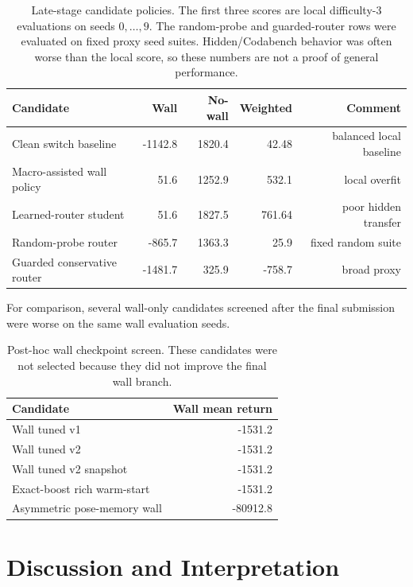 \documentclass[11pt, oneside]{article}   	%
\begin{document}
\begin{table}[htbp]
\centering
\small
\begin{tabular}{p{}rrrr}
\toprule
Candidate & Wall & No-wall & Weighted & Comment \\
\midrule
Clean switch baseline & -1142.8 & 1820.4 & 42.48 & balanced local baseline \\
Macro-assisted wall policy & 51.6 & 1252.9 & 532.1 & local overfit \\
Learned-router student & 51.6 & 1827.5 & 761.64 & poor hidden transfer \\
Random-probe router & -865.7 & 1363.3 & 25.9 & fixed random suite \\
Guarded conservative router & -1481.7 & 325.9 & -758.7 & broad proxy \\
\bottomrule
\end{tabular}
\caption{Late-stage candidate policies. The first three scores are local difficulty-3
evaluations on seeds \(0,\ldots,9\). The random-probe and guarded-router rows were
evaluated on fixed proxy seed suites. Hidden/Codabench behavior was often worse than
the local score, so these numbers are not a proof of general performance.}
\label{tab:late_candidates}
\end{table}

For comparison, several wall-only candidates screened after the final submission were
worse on the same wall evaluation seeds.

\begin{table}[htbp]
\centering
\small
\begin{tabular}{lr}
\toprule
Candidate & Wall mean return \\
\midrule
Wall tuned v1 & -1531.2 \\
Wall tuned v2 & -1531.2 \\
Wall tuned v2 snapshot & -1531.2 \\
Exact-boost rich warm-start & -1531.2 \\
Asymmetric pose-memory wall & -80912.8 \\
\bottomrule
\end{tabular}
\caption{Post-hoc wall checkpoint screen. These candidates were not selected because
they did not improve the final wall branch.}
\end{table}

\section{Discussion and Interpretation}
\end{document}
